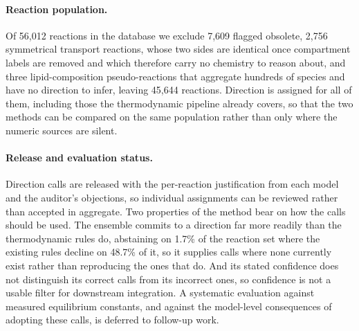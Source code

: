 \paragraph{Reaction population.} Of 56,012 reactions in the database we
exclude 7,609 flagged obsolete, 2,756 symmetrical transport reactions, whose
two sides are identical once compartment labels are removed and which
therefore carry no chemistry to reason about, and three lipid-composition
pseudo-reactions that aggregate hundreds of species and have no direction to
infer, leaving 45,644 reactions. Direction is assigned for all of them, including those the
thermodynamic pipeline already covers, so that the two methods can be compared
on the same population rather than only where the numeric sources are silent.

\paragraph{Release and evaluation status.} Direction calls are released with
the per-reaction justification from each model and the auditor's objections,
so individual assignments can be reviewed rather than accepted in aggregate.
Two properties of the method bear on how the calls should be used. The
ensemble commits to a direction far more readily than the thermodynamic rules
do, abstaining on 1.7\% of the reaction set where the existing rules decline
on 48.7\% of it, so it supplies calls where none currently exist rather than
reproducing the ones that do. And its stated confidence does not distinguish
its correct calls from its incorrect ones, so confidence is not a usable
filter for downstream integration. A systematic
evaluation against measured equilibrium constants, and against the
model-level consequences of adopting these calls, is deferred to follow-up
work.
